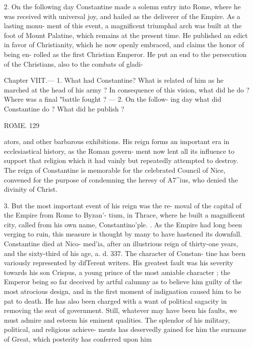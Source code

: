 \documentclass[openany,a4paper]{memoir}
\begin{document}
2. On the following day Constantine made a solemn entry 
into Rome, where he was received with universal joy, and 
hailed as the deliverer of the Empire. As a lasting monu- 
ment of this event, a magnificent triumphal arch was built 
at the foot of Mount Palatine, which remains at the present 
time. He published an edict in favor of Christianity, which 
he now openly embraced, and claims the honor of being en- 
rolled as the first Christian Emperor. He put an end to the 
persecution of the Christians, also to the combats of gladi- 



Chapter VIIT.— 1. What had Constantine? What is related of him 
as he marched at the head of his army ? In consequence of this vision, 
what did he do ? Where was a final "battle fought ? — 2. On the follow- 
ing day what did Constantine do ? What did he publish ? 



ROME. 129 

ators, and other barbarous exhibitions. His reign forms an 
important era in ecclesiastical history, as the Roman govern- 
ment now lent all its influence to support that religion which 
it had vainly but repeatedly attempted to destroy. The 
reign of Constantine is memorable for the celebrated Council 
of Nice, convened for the purpose of condemning the heresy 
of A7^ius, who denied the divinity of Christ. 

3. But the most important event of his reign was the re- 
moval of the capital of the Empire from Rome to Byzan'- 
tium, in Thrace, where he built a magnificent city, called 
from his own name, Constantino'ple. . As the Empire had 
long been verging to ruin, this measure is thought by many 
to have hastened its downfall. Constantine died at Nico- 
med'ia, after an illustrious reign of thirty-one years, and the 
sixty-third of his age, a. d. 337. The character of Constan- 
tine has been variously represented by difTerent writers. His 
greatest fault was his severity towards his son Crispus, a 
young prince of the most amiable character ; the Emperor 
being so far deceived by artful calumny as to believe him 
guilty of the most atrocious design, and in the first moment 
of indignation caused him to be pat to death. He has also 
been charged with a want of political sagacity in removing 
the seat of government. Still, whatever may have been his 
faults, we must admire and esteem his eminent qualities. 
The splendor of his military, political, and religious achieve- 
ments has deservedly gained for him the surname of Great, 
which posterity has conferred upon him 
\end{document}
